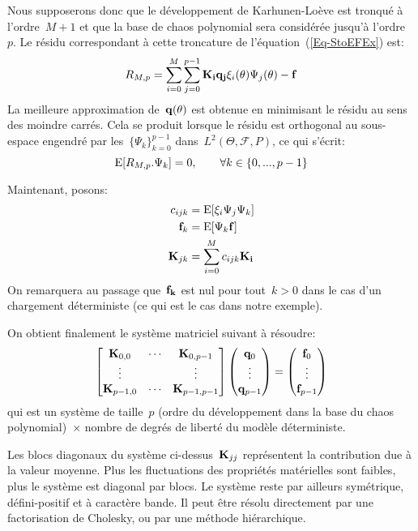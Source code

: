\medskip
Nous supposerons donc que le développement de Karhunen-Loève est tronqué à l'ordre~$M+1$ et que la base de chaos polynomial sera considérée jusqu'à l'ordre~$p$. Le résidu correspondant à cette troncature de l'équation~(\ref{Eq-StoEFEx}) est:
\begin{equation}
R_{M,p} = 
\dsum_{i=0}^M\dsum_{j=0}^{p-1} \MM{K_i}\VV{q_j}\xi_i(\theta)\Psi_j(\theta) - \VV{f}
\end{equation}
La meilleure approximation de~$\VV{q(\theta)}$ est obtenue en minimisant le résidu au sens des moindre carrés. Cela se produit lorsque le résidu est orthogonal au sous-espace engendré par les~$\{\Psi_k\}_{k=0}^{p-1}$ dans~$L^2(\Theta,\mathcal{F},P)$, ce qui s'écrit:
\begin{equation}
   \operatorname{E}[R_{M,p}.\Psi_k]=0, \qquad \forall k\in\{0, ..., p-1\}
\end{equation}

\medskip
Maintenant, posons:
\begin{align}
c_{ijk} & = \E{\xi_i\Psi_j\Psi_k}\\
\VV{f}_k & = \E{\Psi_k\VV{f}}\\
\MM{K}_{jk} & = \dsum_{i=0}^M c_{ijk}\MM{K_i}
\end{align}
On remarquera au passage que~$\VV{f_k}$ est nul pour tout~$k>0$ dans le cas d'un chargement déterministe (ce qui est le cas dans notre exemple).

\medskip
On obtient finalement le système matriciel suivant à résoudre:
\begin{equation}
\MM*{\MM{K}_{0,0} & \cdots & \MM{K}_{0,p-1}\\
\vdots & &\vdots\\
\MM{K}_{p-1,0} & \cdots & \MM{K}_{p-1,p-1}}
\VV*{\VV{q}_0 \\ \vdots \\ \VV{q}_{p-1}}
= \VV*{\VV{f}_0 \\ \vdots \\ \VV{f}_{p-1}}
\end{equation}
qui est un système de taille~$p$ (ordre du développement dans la base du chaos polynomial)~$\times$ nombre de degrés de liberté du modèle déterministe.

\medskip
Les blocs diagonaux du système ci-dessus~$\MM{K}_{jj}$ représentent la contribution due à la valeur moyenne. Plus les fluctuations des propriétés matérielles sont faibles, plus le système est diagonal par blocs. Le système reste par ailleurs symétrique, défini-positif et à caractère bande.
Il peut être résolu directement par une factorisation de Cholesky, ou par une méthode hiérarchique.


